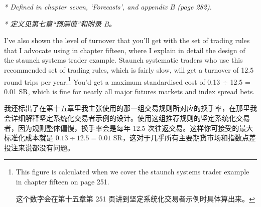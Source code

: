 \smallskip \noindent\textit{* Defined in chapter seven, ‘Forecasts', and appendix B (page 282).}

\smallskip \noindent\textit{* 定义见第七章“预测值”和附录 B。}

\begin{englishblock} I've also shown the level of turnover that you'll get with the set of trading rules that I advocate using in chapter fifteen, where I explain in detail the design of the staunch systems trader example. Staunch systematic traders who use this recommended set of trading rules, which is fairly slow, will get a turnover of 12.5 round trips per year.\footnote{This figure is calculated when we cover the staunch systems trader example in chapter fifteen on page 251. \par 这个数字会在第十五章第 251 页讲到坚定系统化交易者示例时具体算出来。} You'd get a maximum standardised cost of 0.13 ÷ 12.5 = 0.01 SR, which is fine for nearly all major futures markets and index spread bets. \end{englishblock}

\begin{chineseblock}我还标出了在第十五章里我主张使用的那一组交易规则所对应的换手率，在那里我会详细解释坚定系统化交易者示例的设计。使用这组推荐规则的坚定系统化交易者，因为规则整体偏慢，换手率会是每年 12.5 次往返交易。这样你可接受的最大标准化成本就是 \(0.13 \div 12.5 = 0.01\) SR，这对于几乎所有主要期货市场和指数点差投注来说都没有问题。\end{chineseblock}



